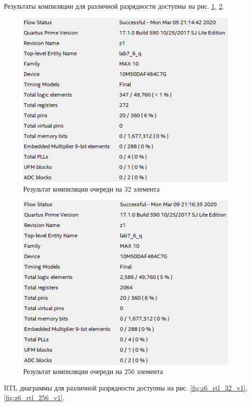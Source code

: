 \documentclass[a4paper,14pt]{article}
\begin{document}
		
		Результаты компиляции для различной разрядности доступны на рис. \ref{fig:z6_res_32_v1}, \ref{fig:z6_res_256_v1}.
		
		\begin{figure}[H]
			\centering
			\includegraphics[width=0.8\linewidth]{images/z6_res_32_v1}
			\caption{Результат компиляции очереди на 32 элемента}
			\label{fig:z6_res_32_v1}
		\end{figure}
		
		\begin{figure}[H]
			\centering
			\includegraphics[width=0.8\linewidth]{images/z6_res_256_v1}
			\caption{Результат компиляции очереди на 256 элемента}
			\label{fig:z6_res_256_v1}
		\end{figure}
	
		RTL диаграммы для различной разрядности доступны на рис. \ref{fig:z6_rtl_32_v1}, \ref{fig:z6_rtl_256_v1}.
		
\end{document}
